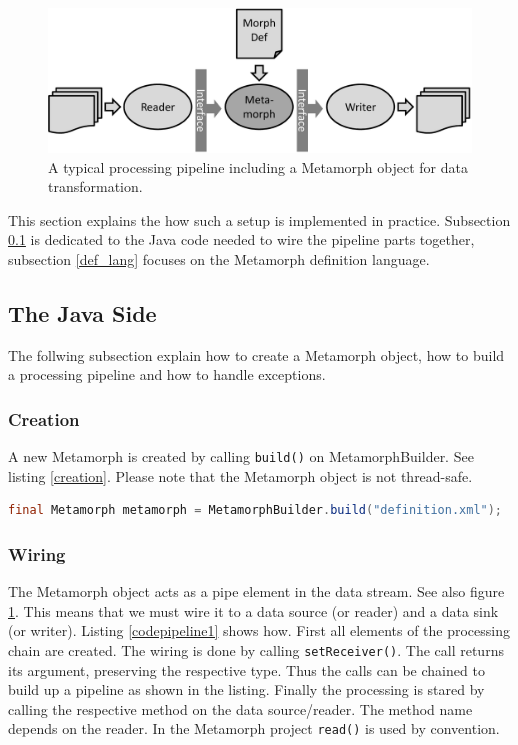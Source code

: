 \documentclass[12pt,a4paper]{article}
\begin{document}
\begin{figure}[htp]
\centering
\includegraphics[width=.70\textwidth]{figures/readerwriter}
\caption{A typical processing pipeline including a Metamorph object for data transformation.}\label{fig:readerwriter}
\end{figure}


This section explains the how such a setup is implemented in practice. Subsection \ref{java} is dedicated to the Java code needed to wire the pipeline parts together, subsection \ref{def_lang} focuses on the Metamorph definition language. 


\subsection{The Java Side}\label{java}

The follwing subsection explain how to create a Metamorph object, how to build a processing pipeline and how to handle exceptions.

\subsubsection{Creation}

A new Metamorph is created by calling {\tt build()} on MetamorphBuilder. See listing \ref{creation}. Please note that the Metamorph object is not thread-safe. 

\begin{lstlisting}[float=htb, label=creation, caption=Creating a Metamorph object based on a Metamorph description., language=Java]
final Metamorph metamorph = MetamorphBuilder.build("definition.xml");
\end{lstlisting}

\subsubsection{Wiring}
The Metamorph object acts as a pipe element in the data stream. See also figure \ref{fig:readerwriter}. This means that we must wire it to a data source (or reader) and a data sink (or writer). Listing \ref{codepipeline1} shows how. First all elements of the processing chain are created.
The wiring is done by calling {\tt setReceiver()}. The call returns its argument, preserving the respective type. Thus the calls can be chained to build up a pipeline as shown in the listing. Finally the processing is stared by calling the respective method on the data source/reader. The method name depends on the reader. In the Metamorph project {\tt read()} is used by convention.
\end{document}
